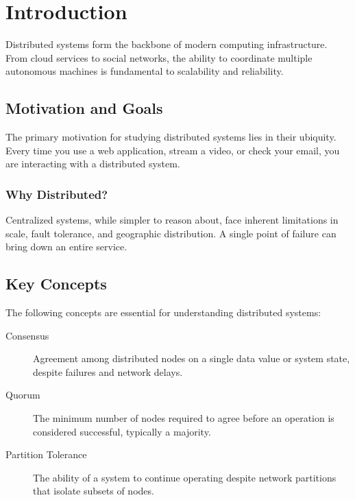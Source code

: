 \documentclass[12pt]{article}
\begin{document}
\maketitlepage

\maketoc


\section{Introduction}
Distributed systems form the backbone of modern computing infrastructure.
From cloud services to social networks, the ability to coordinate multiple
autonomous machines is fundamental to scalability and reliability.

\subsection{Motivation and Goals}
The primary motivation for studying distributed systems lies in their
ubiquity. Every time you use a web application, stream a video, or check
your email, you are interacting with a distributed system.

\subsubsection{Why Distributed?}
Centralized systems, while simpler to reason about, face inherent
limitations in scale, fault tolerance, and geographic distribution.
A single point of failure can bring down an entire service.

\subsection{Key Concepts}
The following concepts are essential for understanding distributed systems:

\begin{description}
  \item[Consensus] Agreement among distributed nodes on a single
    data value or system state, despite failures and network delays.
  \item[Quorum] The minimum number of nodes required to agree before
    an operation is considered successful, typically a majority.
  \item[Partition Tolerance] The ability of a system to continue
    operating despite network partitions that isolate subsets of nodes.
\end{description}
\end{document}
